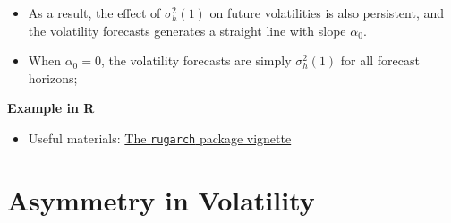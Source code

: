 \documentclass[]{book}
\newenvironment{Shaded}{\begin{snugshade}}{\end{snugshade}}
\newcommand{\CommentTok}[1]{\textcolor[rgb]{0.56,0.35,0.01}{\textit{#1}}}
\newcommand{\DataTypeTok}[1]{\textcolor[rgb]{0.13,0.29,0.53}{#1}}
\newcommand{\DecValTok}[1]{\textcolor[rgb]{0.00,0.00,0.81}{#1}}
\newcommand{\KeywordTok}[1]{\textcolor[rgb]{0.13,0.29,0.53}{\textbf{#1}}}
\newcommand{\NormalTok}[1]{#1}
\newcommand{\OperatorTok}[1]{\textcolor[rgb]{0.81,0.36,0.00}{\textbf{#1}}}
\newcommand{\OtherTok}[1]{\textcolor[rgb]{0.56,0.35,0.01}{#1}}
\newcommand{\StringTok}[1]{\textcolor[rgb]{0.31,0.60,0.02}{#1}}
\providecommand{\tightlist}{%
  \setlength{\itemsep}{0pt}\setlength{\parskip}{0pt}}
\begin{document}
\begin{itemize}
\tightlist
\item
  As a result, the effect of \(\sigma^2_h(1 )\) on future volatilities is also persistent, and the volatility forecasts generates a straight line with slope \(\alpha_0\).
\item
  When \(\alpha_0 = 0\), the volatility forecasts are simply \(\sigma_h^2(1)\) for all forecast horizons;
\end{itemize}

\newpage

\textbf{Example in R}

\begin{Shaded}
\end{Shaded}

\begin{itemize}
\tightlist
\item
  Useful materials: \href{https://cran.r-project.org/web/packages/rugarch/vignettes/Introduction_to_the_rugarch_package.pdf}{The \texttt{rugarch} package vignette}
\end{itemize}

\hypertarget{asymmetry-in-volatility}{%
\section{Asymmetry in Volatility}\label{asymmetry-in-volatility}}
\end{document}
